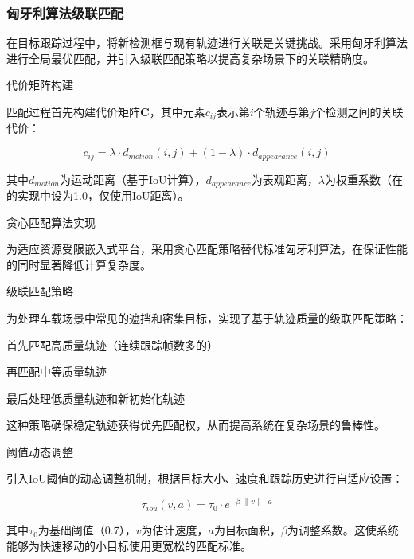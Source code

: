 \documentclass[a4paper, UTF8, fontsize=12pt]{ctexart} %
\numberwithin{equation}{section} %
\begin{document}
\subsubsection{匈牙利算法级联匹配}

在目标跟踪过程中，将新检测框与现有轨迹进行关联是关键挑战。采用匈牙利算法进行全局最优匹配，并引入级联匹配策略以提高复杂场景下的关联精确度。

\begin{parlist}
\item 代价矩阵构建

匹配过程首先构建代价矩阵$\mathbf{C}$，其中元素$c_{ij}$表示第$i$个轨迹与第$j$个检测之间的关联代价：

\begin{equation}
c_{ij} = \lambda \cdot d_{motion}(i,j) + (1-\lambda) \cdot d_{appearance}(i,j)
\end{equation}

其中$d_{motion}$为运动距离（基于IoU计算），$d_{appearance}$为表观距离，$\lambda$为权重系数（在的实现中设为1.0，仅使用IoU距离）。

\item 贪心匹配算法实现

为适应资源受限嵌入式平台，采用贪心匹配策略替代标准匈牙利算法，在保证性能的同时显著降低计算复杂度。

\item 级联匹配策略

为处理车载场景中常见的遮挡和密集目标，实现了基于轨迹质量的级联匹配策略：

\begin{circledlist}
    \item 首先匹配高质量轨迹（连续跟踪帧数多的）
    \item 再匹配中等质量轨迹
    \item 最后处理低质量轨迹和新初始化轨迹
\end{circledlist}

这种策略确保稳定轨迹获得优先匹配权，从而提高系统在复杂场景的鲁棒性。

\item 阈值动态调整

引入IoU阈值的动态调整机制，根据目标大小、速度和跟踪历史进行自适应设置：

\begin{equation}
\tau_{iou}(v, a) = \tau_0 \cdot e^{-\beta \cdot \|v\| \cdot a}
\end{equation}

其中$\tau_0$为基础阈值（0.7），$v$为估计速度，$a$为目标面积，$\beta$为调整系数。这使系统能够为快速移动的小目标使用更宽松的匹配标准。

\end{parlist}
\end{document}
